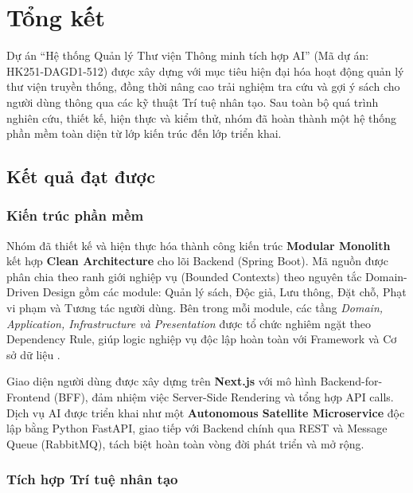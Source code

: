 
\chapter{Tổng kết}

Dự án ``Hệ thống Quản lý Thư viện Thông minh tích hợp AI'' (Mã dự án: HK251-DAGD1-512) được xây dựng với mục tiêu hiện đại hóa hoạt động quản lý thư viện truyền thống, đồng thời nâng cao trải nghiệm tra cứu và gợi ý sách cho người dùng thông qua các kỹ thuật Trí tuệ nhân tạo. Sau toàn bộ quá trình nghiên cứu, thiết kế, hiện thực và kiểm thử, nhóm đã hoàn thành một hệ thống phần mềm toàn diện từ lớp kiến trúc đến lớp triển khai.

\section{Kết quả đạt được}

\subsection{Kiến trúc phần mềm}

Nhóm đã thiết kế và hiện thực hóa thành công kiến trúc \textbf{Modular Monolith} kết hợp \textbf{Clean Architecture} cho lõi Backend (Spring Boot). Mã nguồn được phân chia theo ranh giới nghiệp vụ (Bounded Contexts) theo nguyên tắc Domain-Driven Design gồm các module: Quản lý sách, Độc giả, Lưu thông, Đặt chỗ, Phạt vi phạm và Tương tác người dùng. Bên trong mỗi module, các tầng \textit{Domain, Application, Infrastructure và Presentation} được tổ chức nghiêm ngặt theo Dependency Rule, giúp logic nghiệp vụ độc lập hoàn toàn với Framework và Cơ sở dữ liệu \cite{newman2015building}.

Giao diện người dùng được xây dựng trên \textbf{Next.js} với mô hình Backend-for-Frontend (BFF), đảm nhiệm việc Server-Side Rendering và tổng hợp API calls. Dịch vụ AI được triển khai như một \textbf{Autonomous Satellite Microservice} độc lập bằng Python FastAPI, giao tiếp với Backend chính qua REST và Message Queue (RabbitMQ), tách biệt hoàn toàn vòng đời phát triển và mở rộng.

\subsection{Tích hợp Trí tuệ nhân tạo}

